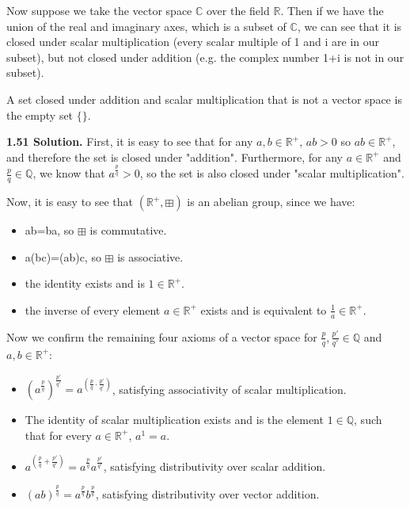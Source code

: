 Now suppose we take the vector space $\mathbb{C}$ over the field $\mathbb{R}$. Then if we have the union of the real and imaginary axes, which is a subset of $\mathbb{C}$, we can see that it is closed under scalar multiplication (every scalar multiple of 1 and i are in our subset), but not closed under addition (e.g. the complex number 1+i is not in our subset).

A set closed under addition and scalar multiplication that is not a vector space is the empty set $\{\}$.

\textbf{1.51 Solution.} First, it is easy to see that for any $a,b\in\mathbb{R}^+$, $ab>0$ so $ab\in\mathbb{R}^+$, and therefore the set is closed under "addition". Furthermore, for any $a\in\mathbb{R}^+$ and $\frac{p}{q}\in\mathbb{Q}$, we know that $a^{\frac{p}{q}}>0$, so the set is also closed under "scalar multiplication".

Now, it is easy to see that $(\mathbb{R}^+,\boxplus)$ is an abelian group, since we have:
\begin{itemize}
    \setlength{\parskip}{0pt}
    \item ab=ba, so $\boxplus$ is commutative.
    \item a(bc)=(ab)c, so $\boxplus$ is associative.
    \item the identity exists and is $1\in\mathbb{R}^+$.
    \item the inverse of every element $a\in\mathbb{R}^+$ exists and is equivalent to $\frac{1}{a}\in\mathbb{R}^+$.
\end{itemize}

Now we confirm the remaining four axioms of a vector space for $\frac{p}{q},\frac{p'}{q'}\in\mathbb{Q}$ and $a,b\in\mathbb{R}^+$:
\begin{itemize}
    \setlength{\parskip}{0pt}
    \item $(a^{\frac{p}{q}})^{\frac{p'}{q'}} = a^{(\frac{p}{q}\cdot\frac{p'}{q'})}$, satisfying associativity of scalar multiplication.
    \item The identity of scalar multiplication exists and is the element $1\in\mathbb{Q}$, such that for every $a\in\mathbb{R}^+$, $a^1=a$.
    \item $a^{(\frac{p}{q}+\frac{p'}{q'})} = a^{\frac{p}{q}}a^{\frac{p'}{q'}}$, satisfying distributivity over scalar addition.
    \item $(ab)^{\frac{p}{q}}=a^{\frac{p}{q}}b^{\frac{p}{q}}$, satisfying distributivity over vector addition.
\end{itemize}

